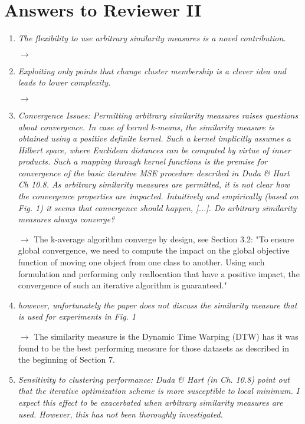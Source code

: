 \documentclass[10pt]{article}
\begin{document}
\section{Answers to Reviewer II}


\begin{enumerate}

\item \emph{The flexibility to use arbitrary similarity measures is a novel contribution.}

$\rightarrow$

\item \emph{Exploiting only points that change cluster membership is a clever idea and leads to lower complexity.}

$\rightarrow$


\item \emph{Convergence Issues: Permitting arbitrary similarity measures raises questions about convergence. In case of kernel k-means, the similarity measure is obtained using a positive definite kernel. Such a kernel implicitly assumes a Hilbert space, where Euclidean distances can be computed by virtue of inner products. Such a mapping through kernel functions is the premise for convergence of the basic iterative MSE procedure described in Duda \& Hart Ch 10.8. As arbitrary similarity measures are permitted, it is not clear how the convergence properties are impacted. Intuitively and empirically (based on Fig. 1) it seems that convergence should happen, [...]. Do arbitrary similarity measures always converge?}

$\rightarrow$ The k-average algorithm converge by design, see Section 3.2: "To ensure global convergence, we need to compute the impact on the global objective function of moving one object from one class to another. Using such formulation and performing only reallocation that have a positive impact, the convergence of such an iterative algorithm is guaranteed."

\item \emph{however, unfortunately the paper does not discuss the similarity measure that is used for experiments in Fig. 1}

$\rightarrow$ The similarity measure is the Dynamic Time Warping (DTW) has it was found to be the best performing measure for those datasets as described in the beginning of Section 7.


\item \emph{Sensitivity to clustering performance:
Duda \& Hart (in Ch. 10.8) point out that the iterative optimization scheme is more susceptible to local minimum. I expect this effect to be exacerbated when arbitrary similarity measures are used. However, this has not been thoroughly investigated.}


\end{enumerate}
\end{document}
